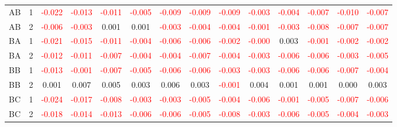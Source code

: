 \begin{table}[!htb]
{\begin{tabular}{llcccccccccccc}
AB & 1 & \textcolor{red}{-0.022} & \textcolor{red}{-0.013} & \textcolor{red}{-0.011} & \textcolor{red}{-0.005} & \textcolor{red}{-0.009} & \textcolor{red}{-0.009} & \textcolor{red}{-0.009} & \textcolor{red}{-0.003} & \textcolor{red}{-0.004} & \textcolor{red}{-0.007} & \textcolor{red}{-0.010} & \textcolor{red}{-0.007}\\
AB & 2 & \textcolor{red}{-0.006} & \textcolor{red}{-0.003} & 0.001 & 0.001 & \textcolor{red}{-0.003} & \textcolor{red}{-0.004} & \textcolor{red}{-0.004} & \textcolor{red}{-0.001} & \textcolor{red}{-0.003} & \textcolor{red}{-0.008} & \textcolor{red}{-0.007} & \textcolor{red}{-0.007}\\
BA & 1 & \textcolor{red}{-0.021} & \textcolor{red}{-0.015} & \textcolor{red}{-0.011} & \textcolor{red}{-0.004} & \textcolor{red}{-0.006} & \textcolor{red}{-0.006} & \textcolor{red}{-0.002} & \textcolor{red}{-0.000} & 0.003 & \textcolor{red}{-0.001} & \textcolor{red}{-0.002} & \textcolor{red}{-0.002}\\
BA & 2 & \textcolor{red}{-0.012} & \textcolor{red}{-0.011} & \textcolor{red}{-0.007} & \textcolor{red}{-0.004} & \textcolor{red}{-0.004} & \textcolor{red}{-0.007} & \textcolor{red}{-0.004} & \textcolor{red}{-0.003} & \textcolor{red}{-0.006} & \textcolor{red}{-0.006} & \textcolor{red}{-0.003} & \textcolor{red}{-0.005}\\
BB & 1 & \textcolor{red}{-0.013} & \textcolor{red}{-0.001} & \textcolor{red}{-0.007} & \textcolor{red}{-0.005} & \textcolor{red}{-0.006} & \textcolor{red}{-0.006} & \textcolor{red}{-0.003} & \textcolor{red}{-0.003} & \textcolor{red}{-0.006} & \textcolor{red}{-0.006} & \textcolor{red}{-0.007} & \textcolor{red}{-0.004}\\
BB & 2 & 0.001 & 0.007 & 0.005 & 0.003 & 0.006 & 0.003 & \textcolor{red}{-0.001} & 0.004 & 0.001 & 0.001 & 0.000 & 0.003\\
BC & 1 & \textcolor{red}{-0.024} & \textcolor{red}{-0.017} & \textcolor{red}{-0.008} & \textcolor{red}{-0.003} & \textcolor{red}{-0.003} & \textcolor{red}{-0.005} & \textcolor{red}{-0.004} & \textcolor{red}{-0.006} & \textcolor{red}{-0.001} & \textcolor{red}{-0.005} & \textcolor{red}{-0.007} & \textcolor{red}{-0.006}\\
BC & 2 & \textcolor{red}{-0.018} & \textcolor{red}{-0.014} & \textcolor{red}{-0.013} & \textcolor{red}{-0.006} & \textcolor{red}{-0.006} & \textcolor{red}{-0.005} & \textcolor{red}{-0.008} & \textcolor{red}{-0.003} & \textcolor{red}{-0.006} & \textcolor{red}{-0.005} & \textcolor{red}{-0.004} & \textcolor{red}{-0.003}\\

\end{tabular}}
\end{table}
